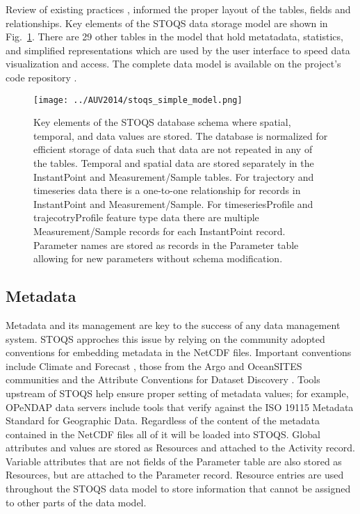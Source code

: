 \documentclass[conference]{IEEEtran}
\begin{document}
Review of existing practices \cite{Wright}, \cite{MODB} informed the proper layout 
of the tables, fields and relationships.  Key elements of the STOQS data storage model 
are shown in Fig.~\ref{fig:stoqs_simple_model}. There are 29 other tables in the model 
that hold metatadata, statistics, and simplified representations which are used by 
the user interface to speed data visualization and access. The complete data model 
is available on the project's code repository \cite{STOQS}. 

\begin{figure}[htbp]
\centering
\texttt{[image: ../AUV2014/stoqs\_simple\_model.png]}
\caption{Key elements of the STOQS database schema where spatial, temporal, and data 
values are stored. The database is normalized for efficient storage of data such 
that data are not repeated in any of the tables. Temporal and spatial data are stored 
separately in the InstantPoint and Measurement/Sample tables. For trajectory and 
timeseries data there is a one-to-one relationship for records in InstantPoint and 
Measurement/Sample. For timeseriesProfile and trajecotryProfile feature type data 
there are multiple Measurement/Sample records for each InstantPoint record. 
Parameter names are stored as records in the Parameter table allowing for new 
parameters without schema modification.}
\label{fig:stoqs_simple_model}
\end{figure}

\subsection{Metadata}

Metadata and its management are key to the success of any data management system. 
STOQS approches this issue by relying on the community adopted conventions for 
embedding metadata in the NetCDF files. Important conventions include Climate and 
Forecast \cite{CF}, those from the Argo and OceanSITES communities \cite{Pouliquen2006} 
and the Attribute Conventions for Dataset Discovery \cite{ACDD}. Tools upstream 
of STOQS help ensure proper setting of metadata values; for example, OPeNDAP data 
servers include tools that verify against the ISO 19115 Metadata Standard for 
Geographic Data. Regardless of the content of the metadata contained in the NetCDF 
files all of it will be loaded into STOQS. Global attributes and values are stored 
as Resources and attached to the Activity record. Variable attributes that are not 
fields of the Parameter table are also stored as Resources, but are attached to the 
Parameter record. Resource entries are used throughout the STOQS data model to store 
information that cannot be assigned to other parts of the data model.
\end{document}
